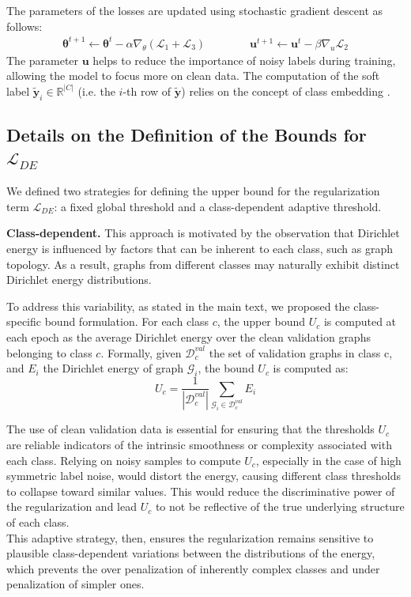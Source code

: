 {The parameters of the losses are updated using stochastic gradient descent as follows:
\begin{align}
\mathbf{\theta}^{t+1} \gets \mathbf{\theta}^t - \alpha \nabla_\theta (\mathcal{L}_1 + \mathcal{L}_3) \qquad \qquad \mathbf{u}^{t+1} \gets \mathbf{u}^t - \beta \nabla_u \mathcal{L}_2
\end{align}
The parameter \( \mathbf{u} \) helps to reduce the importance of noisy labels during training, allowing the model to focus more on clean data. The computation of the soft label $\mathbf{\tilde{y}}_i \in \mathbb{R}^{|C|}$ (i.e. the $i$-th row of $\mathbf{\tilde{y}}$) relies on the concept of class embedding \cite{wani2023combining}. 


\subsection{Details on the Definition of the Bounds for $\mathcal L_{DE}$}
\label{appendix:details_dirichlet_regularization_bounds}
We defined two strategies for defining the upper bound for the regularization term $\mathcal L_{DE}$: a fixed global threshold and a class-dependent adaptive threshold.

\textbf{Class-dependent.} This approach is motivated by the observation that Dirichlet energy is influenced by factors that can be inherent to each class, such as graph topology. As a result, graphs from different classes may naturally exhibit distinct Dirichlet energy distributions.

To address this variability, as stated in the main text, we proposed the class-specific bound formulation. For each class $c$, the upper bound $U_c$ is computed at each epoch as the average Dirichlet energy over the clean validation graphs belonging to class $c$. Formally, given $\mathcal D^{val}_c$ the set of validation graphs in class c, and $E_i$ the Dirichlet energy of graph $\mathcal G_i$, the bound $U_c$ is computed as:
\begin{equation}
    U_c = \frac 1 {|\mathcal D^{val}_c|} \sum_{\mathcal G_i \in \mathcal D^{val}_c} E_i
\end{equation}

The use of clean validation data is essential for ensuring that the thresholds $U_c$ are reliable indicators of the intrinsic smoothness or complexity associated with each class. Relying on noisy samples to compute $U_c$, especially in the case of high symmetric label noise, would distort the energy, causing different class thresholds to collapse toward similar values. This would reduce the discriminative power of the regularization and lead $U_c$ to not be reflective of the true underlying structure of each class. \\
This adaptive strategy, then, ensures the regularization remains sensitive to plausible class-dependent variations between the distributions of the energy, which prevents the over penalization of inherently complex classes and under penalization of simpler ones.


}
